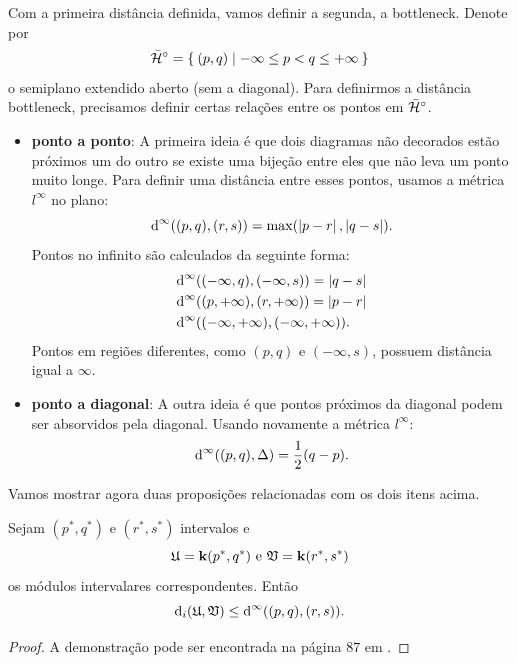 Com a primeira distância definida, vamos definir a segunda, a bottleneck. Denote por 
\begin{equation*}
    \bar{\mathcal{H}}^\circ = \Set{(p,q) | -\infty \leq p < q \leq +\infty}
\end{equation*}
o semiplano extendido aberto (sem a diagonal). Para definirmos a distância bottleneck,
precisamos definir certas relações entre os pontos em $\bar{\mathcal{H}}^\circ$.  
\begin{itemize}
    \item \textbf{ponto a ponto}: A primeira ideia é que dois diagramas não decorados estão
    próximos um do outro se existe uma bijeção entre eles que não leva um ponto muito longe.
    Para definir uma distância entre esses pontos, usamos a métrica $l^\infty$ no plano:
    \begin{equation*}
        \text{d}^\infty((p,q), (r,s)) = \max(\left\lvert p-r\right\rvert, \left\lvert q-s\right\rvert).
    \end{equation*}
    Pontos no infinito são calculados da seguinte forma:
    \begin{align*}
        &\text{d}^\infty((-\infty, q), (-\infty,s)) = \left\lvert q-s\right\rvert \\
        &\text{d}^\infty((p, +\infty), (r,+\infty)) = \left\lvert p-r\right\rvert \\
        &\text{d}^\infty((-\infty, +\infty), (-\infty, +\infty)).
    \end{align*}
    Pontos em regiões diferentes, como $(p,q)$ e $(-\infty,s)$, possuem distância igual a
    $\infty$.
    \item \textbf{ponto a diagonal}: A outra ideia é que pontos próximos da diagonal podem ser
    absorvidos pela diagonal. Usando novamente a métrica $l^\infty$:
    \begin{equation*}
        \text{d}^\infty((p,q), \Delta) = \frac{1}{2}(q-p).
    \end{equation*}
\end{itemize}

Vamos mostrar agora duas proposições relacionadas com os dois itens acima. 
\begin{propo}\label{teo:int_ineq}
    Sejam $(p^*, q^*)$ e $(r^*, s^*)$ intervalos e 
    \begin{equation*}
        \mathfrak{U} = \mathbf{k}(p^*, q^*) \text{ e } \mathfrak{V} = \mathbf{k}(r^*, s^*)
    \end{equation*}
    os módulos intervalares correspondentes. Então
    \begin{equation*}
        \text{d}_i(\mathfrak{U}, \mathfrak{V}) \leq \text{d}^\infty((p,q), (r,s)).
    \end{equation*}
\end{propo}
\begin{proof}
    A demonstração pode ser encontrada na página $87$ em \cite{Chazal2016}.
\end{proof}

